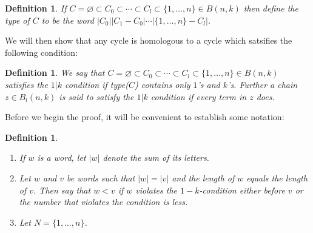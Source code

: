 \documentclass{amsart}
\newtheorem{definition}[theorem]{Definition}
\newcommand{\GC}{\varnothing \subset C_0 \subset \cdots \subset C_l \subset \{1, \ldots, n\}}
\begin{document}
\begin{definition} 
  If $C=\GC \in B(n ,k)$ then define the type of $C$ to be the word $|C_0||C_1 - C_0| \cdots |\{1, \ldots, n\} - C_l|$.
\end{definition}

We will then show that any cycle is homologous to a cycle which satsifies the following condition:

\begin{definition}
  We say that $C=\GC \in B(n, k)$ satisfies the $1|k$ condition if type($C$) contains only $1$'s and $k$'s. Further a chain
  $z \in B_l(n, k)$ is said to satisfy the $1|k$ condition if every term in $z$ does.
\end{definition}

Before we begin the proof, it will be convenient to establish some notation:
\begin{definition}  
  \begin{enumerate}
        \item If $w$ is a word, let $|w|$ denote the sum of its letters.
        \item Let $w$ and $v$ be words such that $|w| = |v|$ and the length of $w$ equals the length of $v$. Then say
              that $w < v$ if $w$ violates the $1-k$-condition either before $v$ or the number that violates the condition
              is less. 
        \item Let $N = \{1, \ldots, n \}$.
     \end{enumerate}
\end{definition}
\end{document}
